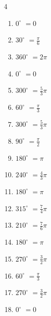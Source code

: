 \begin{multicols}{4}
\begin{enumerate}
  \item $\displaystyle 0^{\circ}$
        $\displaystyle =0$

  \item $\displaystyle 30^{\circ}$
        $\displaystyle =\frac{\pi}{6}$

  \item $\displaystyle 360^{\circ}$
        $\displaystyle =2\pi$

  \item $\displaystyle 0^{\circ}$
        $\displaystyle =0$

  \item $\displaystyle 300^{\circ}$
        $\displaystyle =\frac{5}{3}\pi$

  \item $\displaystyle 60^{\circ}$
        $\displaystyle =\frac{\pi}{3}$

  \item $\displaystyle 300^{\circ}$
        $\displaystyle =\frac{5}{3}\pi$

  \item $\displaystyle 90^{\circ}$
        $\displaystyle =\frac{\pi}{2}$

  \item $\displaystyle 180^{\circ}$
        $\displaystyle =\pi$

  \item $\displaystyle 240^{\circ}$
        $\displaystyle =\frac{4}{3}\pi$

  \item $\displaystyle 180^{\circ}$
        $\displaystyle =\pi$

  \item $\displaystyle 315^{\circ}$
        $\displaystyle =\frac{7}{4}\pi$

  \item $\displaystyle 210^{\circ}$
        $\displaystyle =\frac{7}{6}\pi$

  \item $\displaystyle 180^{\circ}$
        $\displaystyle =\pi$

  \item $\displaystyle 270^{\circ}$
        $\displaystyle =\frac{3}{2}\pi$

  \item $\displaystyle 60^{\circ}$
        $\displaystyle =\frac{\pi}{3}$

  \item $\displaystyle 270^{\circ}$
        $\displaystyle =\frac{3}{2}\pi$

  \item $\displaystyle 0^{\circ}$
        $\displaystyle =0$


\end{enumerate}
\end{multicols}
